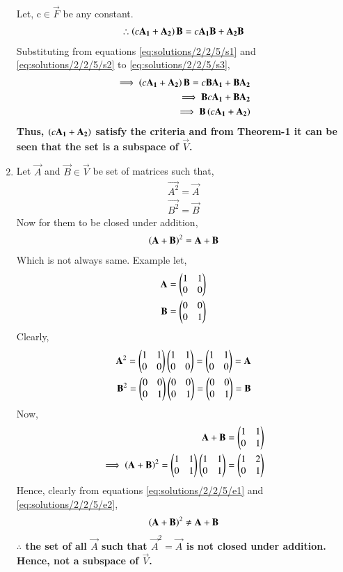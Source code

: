 \begin{enumerate}
\begin{align}
\end{align}
Let, c$\in \vec{F}$ be any constant.   
\begin{align}
\therefore \left(c\mathbf{A_1}+\mathbf{A_2}\right)\mathbf{B} = c\mathbf{A_1B} +\mathbf{A_2B}\label{eq:solutions/2/2/5/s3}
\end{align}
Substituting from equations \eqref{eq:solutions/2/2/5/s1} and \eqref{eq:solutions/2/2/5/s2} to \eqref{eq:solutions/2/2/5/s3},
\begin{align}
\implies \left(c\mathbf{A_1}+\mathbf{A_2}\right)\mathbf{B} = c\mathbf{BA_1} +\mathbf{BA_2}\\
\implies \mathbf{B}c\mathbf{A_1} +\mathbf{BA_2}\\
\implies \mathbf{B}\left(c\mathbf{A_1}+\mathbf{A_2}\right)
\end{align}
\textbf{Thus, $\left(c\mathbf{A_1}+\mathbf{A_2}\right)$ satisfy the criteria and from Theorem-1 it can be seen that the set is a subspace of $\vec{V}$.} 
\item Let $\vec{A}$ and $\vec{B} \in \vec{V}$ be set of matrices such that,
\begin{align}
\vec{A^2}=\vec{A}\\
\vec{B^2}=\vec{B}
\end{align}
Now for them to be closed under addition,
\begin{align}
\left(\mathbf{A+B}\right)^2 = \mathbf{A+B}
\end{align} 
Which is not always same. Example let,
\begin{align}
\mathbf{A} = \begin{pmatrix}1&1\\0&0\end{pmatrix}\\
\mathbf{B} = \begin{pmatrix}0&0\\0&1\end{pmatrix}
\end{align}
Clearly,
\begin{align}
\mathbf{A}^2 = \begin{pmatrix}1&1\\0&0\end{pmatrix}\begin{pmatrix}1&1\\0&0\end{pmatrix} = \begin{pmatrix}1&1\\0&0\end{pmatrix} = \mathbf{A}\\
\mathbf{B}^2 =\begin{pmatrix}0&0\\0&1\end{pmatrix}\begin{pmatrix}0&0\\0&1\end{pmatrix} = \begin{pmatrix}0&0\\0&1\end{pmatrix} = \mathbf{B}
\end{align}
Now, 
\begin{align}
\mathbf{A+B} = \begin{pmatrix}1&1\\0&1\end{pmatrix}\label{eq:solutions/2/2/5/e1}\\
\implies \left(\mathbf{A+B}\right)^2 = \begin{pmatrix}1&1\\0&1\end{pmatrix}\begin{pmatrix}1&1\\0&1\end{pmatrix} = \begin{pmatrix}1&2\\0&1\end{pmatrix}\label{eq:solutions/2/2/5/e2}
\end{align}
Hence, clearly from equations \eqref{eq:solutions/2/2/5/e1} and \eqref{eq:solutions/2/2/5/e2},
\begin{align}
\left(\mathbf{A+B}\right)^2 \neq \mathbf{A+B}
\end{align}
\textbf{$\therefore$ the set of all $\vec{A}$ such that $\vec{A}^2=\vec{A}$ is not closed under addition. Hence, not a subspace of $\vec{V}$.}
\end{enumerate}
